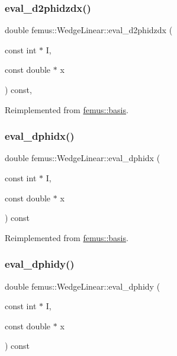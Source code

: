 \subsubsection{\texorpdfstring{eval\+\_\+d2phidzdx()}{eval\_d2phidzdx()}}
{\footnotesize\ttfamily double femus\+::\+Wedge\+Linear\+::eval\+\_\+d2phidzdx (\begin{DoxyParamCaption}\item[{const int $\ast$}]{I,  }\item[{const double $\ast$}]{x }\end{DoxyParamCaption}) const\hspace{0.3cm}{\ttfamily [inline]}, {\ttfamily [virtual]}}



Reimplemented from \mbox{\hyperlink{classfemus_1_1basis_a5d619ec5bd57b7d2dc34a99d69975c77}{femus\+::basis}}.

\mbox{\label{classfemus_1_1_wedge_linear_a0a071d2e692526b8eb39ce5c3c41adf4}} 
\subsubsection{\texorpdfstring{eval\+\_\+dphidx()}{eval\_dphidx()}}
{\footnotesize\ttfamily double femus\+::\+Wedge\+Linear\+::eval\+\_\+dphidx (\begin{DoxyParamCaption}\item[{const int $\ast$}]{I,  }\item[{const double $\ast$}]{x }\end{DoxyParamCaption}) const\hspace{0.3cm}{\ttfamily [virtual]}}



Reimplemented from \mbox{\hyperlink{classfemus_1_1basis_a4db7d29cf8a753ddbccc4a297dafa0bf}{femus\+::basis}}.

\mbox{\label{classfemus_1_1_wedge_linear_a34ad0ff19e2763f3823814c05fcb44c2}} 
\subsubsection{\texorpdfstring{eval\+\_\+dphidy()}{eval\_dphidy()}}
{\footnotesize\ttfamily double femus\+::\+Wedge\+Linear\+::eval\+\_\+dphidy (\begin{DoxyParamCaption}\item[{const int $\ast$}]{I,  }\item[{const double $\ast$}]{x }\end{DoxyParamCaption}) const\hspace{0.3cm}{\ttfamily [virtual]}}




